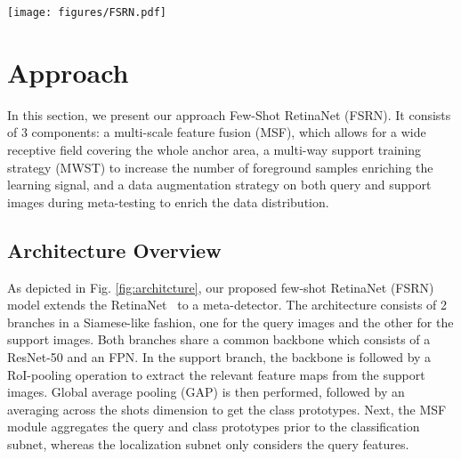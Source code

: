 \documentclass[10pt,twocolumn,letterpaper]{article}
\begin{document}
 \begin{figure*}[t!]
 \centering
 \texttt{[image: figures/FSRN.pdf]}
 \caption{Overview of the our FSRN architecture. First, the multi-way support training strategy (MWST) constructs multi-way tasks per training episode, featuring multiple positive and negative classes. Thereby, more foreground anchors are sampled, resulting in improved discriminability. Next, a multi-scale feature fusion (MSF) module is used on top of the FPN that enables a wide receptive field covering the whole anchor area post-fusion. During meta-testing, an introduced multi-scale data augmentation scheme (MSDA) enriches the scale-space improving the discriminability for novel classes. Additionally, the proposed Gaussian Prototyping (GP) for improved class prototypes.} \label{fig:architcture}\vspace{-1.5em}
\end{figure*} \section{Approach}

In this section, we present our approach Few-Shot RetinaNet (FSRN). It consists of 3 components: a multi-scale feature fusion (MSF), which allows for a wide receptive field covering the whole anchor area, a multi-way support training strategy (MWST) to increase the number of foreground samples enriching the learning signal, and a data augmentation strategy on both query and support images during meta-testing to enrich the data distribution.

\subsection{Architecture Overview}
As depicted in Fig. \ref{fig:architcture}, our proposed few-shot RetinaNet (FSRN) model extends the RetinaNet~\cite{RetinaNet} to a meta-detector. The architecture consists of 2 branches in a Siamese-like fashion, one for the query images and the other for the support images. Both branches share a common backbone which consists of a ResNet-50 and an FPN. In the support branch, the backbone is followed by a RoI-pooling operation to extract the relevant feature maps from the support images. Global average pooling (GAP) is then performed, followed by an averaging across the shots dimension to get the class prototypes. Next, the MSF module aggregates the query and class prototypes prior to the classification subnet, whereas the localization subnet only considers the query features.    
\end{document}
